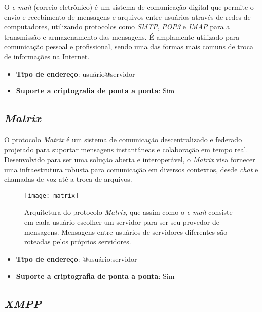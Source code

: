 O \textit{e-mail} (correio eletrônico) é um sistema de comunicação digital que permite o envio e recebimento de mensagens e arquivos entre usuários através de redes de computadores, utilizando protocolos como \textit{SMTP}, \textit{POP3} e \textit{IMAP} para a transmissão e armazenamento das mensagens. É amplamente utilizado para comunicação pessoal e profissional, sendo uma das formas mais comuns de troca de informações na Internet. \cite{rfc5321}

\begin{itemize}
  \item \textbf{Tipo de endereço}: usuário@servidor
  \item \textbf{Suporte a criptografia de ponta a ponta}: Sim
\end{itemize}

\subsection{\textit{Matrix}}

O protocolo \textit{Matrix} é um sistema de comunicação descentralizado e federado projetado para suportar mensagens instantâneas e colaboração em tempo real. Desenvolvido para ser uma solução aberta e interoperável, o \textit{Matrix} visa fornecer uma infraestrutura robusta para comunicação em diversos contextos, desde \textit{chat} e chamadas de voz até a troca de arquivos. \cite{matrixspec}

\begin{figure}
  \centering
  \texttt{[image: matrix]}

  \caption{Arquitetura do protocolo \textit{Matrix}, que assim como o \textit{e-mail} consiste em cada usuário escolher um servidor para ser seu provedor de mensagens. Mensagens entre usuários de servidores diferentes são roteadas pelos próprios servidores. \cite{matrixspec}}
\end{figure}

\begin{itemize}
  \item \textbf{Tipo de endereço}: @usuário:servidor
  \item \textbf{Suporte a criptografia de ponta a ponta}: Sim
\end{itemize}

\subsection{\textit{XMPP}}

